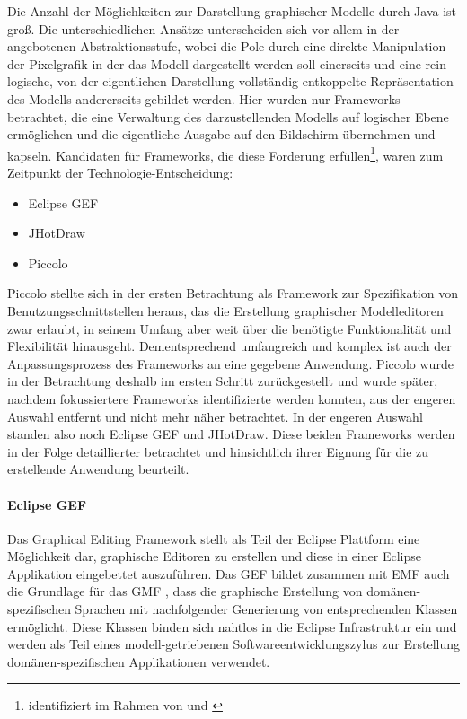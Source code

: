 Die Anzahl der Möglichkeiten zur Darstellung graphischer Modelle durch Java ist groß. Die unterschiedlichen Ansätze unterscheiden sich vor allem in der angebotenen Abstraktionsstufe, wobei die Pole durch eine direkte Manipulation der Pixelgrafik in der das Modell dargestellt werden soll einerseits und eine rein logische, von der eigentlichen Darstellung vollständig entkoppelte Repräsentation des Modells andererseits gebildet werden. Hier wurden nur Frameworks betrachtet, die eine Verwaltung des darzustellenden Modells auf logischer Ebene ermöglichen und die eigentliche Ausgabe auf den Bildschirm übernehmen und kapseln. Kandidaten für Frameworks, die diese Forderung erfüllen\footnote{identifiziert im Rahmen von \citep{Feiner08} und \citep{Seiringer08}}, waren zum Zeitpunkt der Technologie-Entscheidung:
\begin{itemize}
 \item Eclipse GEF \citep{Moore04}
 \item JHotDraw \citep{Gamma96}
 \item Piccolo \citep{Bederson04}
\end{itemize}

Piccolo stellte sich in der ersten Betrachtung als Framework zur Spezifikation von Benutzungsschnittstellen heraus, das die Erstellung graphischer Modelleditoren zwar erlaubt, in seinem Umfang aber weit über die benötigte Funktionalität und Flexibilität hinausgeht. Dementsprechend umfangreich und komplex ist auch der Anpassungsprozess des Frameworks an eine gegebene Anwendung. Piccolo wurde in der Betrachtung deshalb im ersten Schritt zurückgestellt und wurde später, nachdem fokussiertere Frameworks identifizierte werden konnten, aus der engeren Auswahl entfernt und nicht mehr näher betrachtet. In der engeren Auswahl standen also noch Eclipse GEF und JHotDraw. Diese beiden Frameworks werden in der Folge detaillierter betrachtet und hinsichtlich ihrer Eignung für die zu erstellende Anwendung beurteilt.

\paragraph{Eclipse GEF}
\label{par:gefgmf}

Das Graphical Editing Framework \citep{Moore04} stellt als Teil der Eclipse Plattform \citep{Holzner04} eine Möglichkeit dar, graphische Editoren zu erstellen und diese in einer Eclipse Applikation eingebettet auszuführen. Das \gls{GEF} bildet zusammen mit \gls{EMF} \citep{Budinsky03} auch die Grundlage für das \gls{GMF} \citep{Eclipse-Foundation09}, dass die graphische Erstellung von domänen-spezifischen Sprachen mit nachfolgender Generierung von entsprechenden Klassen ermöglicht. Diese Klassen binden sich nahtlos in die Eclipse Infrastruktur ein und werden als Teil eines modell-getriebenen Softwareentwicklungszylus zur Erstellung domänen-spezifischen Applikationen verwendet.

